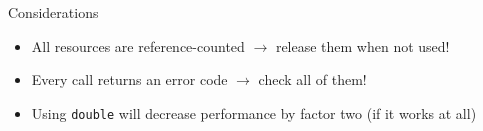\documentclass[18pt]{beamer}
\begin{document}
\begin{frame}[fragile]{Considerations}
  \begin{itemize}
    \item All resources are reference-counted $\rightarrow$ release them when
      not used!
    \item Every call returns an error code $\rightarrow$ check all of them!
    \item Using \texttt{double} will decrease performance by factor two (if it
      works at all)
  \end{itemize}
\end{frame}
\end{document}
